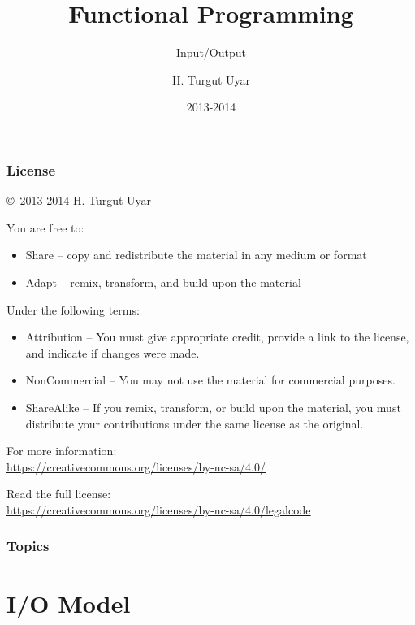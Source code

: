 \documentclass[dvipsnames]{beamer}
\title{Functional Programming}
\subtitle{Input/Output}
\author{H. Turgut Uyar}
\date{2013-2014}
\theoremstyle{plain}
\begin{document}
\begin{frame}
  \titlepage
\end{frame}

\begin{frame}
  \frametitle{License}

  \hfill
  \copyright~2013-2014 H. Turgut Uyar

  \vfill
  \begin{footnotesize}
    You are free to:
    \begin{itemize}
      \itemsep0em
      \item Share -- copy and redistribute the material in any medium or format
      \item Adapt -- remix, transform, and build upon the material
    \end{itemize}

    Under the following terms:
    \begin{itemize}
      \itemsep0em
      \item Attribution -- You must give appropriate credit, provide a link to
        the license, and indicate if changes were made.

      \item NonCommercial -- You may not use the material for commercial
        purposes.

      \item ShareAlike -- If you remix, transform, or build upon the material,
        you must distribute your contributions under the same license as the
        original.
    \end{itemize}
  \end{footnotesize}

  \begin{small}
    For more information:\\
    \url{https://creativecommons.org/licenses/by-nc-sa/4.0/}

    \smallskip
    Read the full license:\\
    \url{https://creativecommons.org/licenses/by-nc-sa/4.0/legalcode}
  \end{small}
\end{frame}

\begin{frame}
  \frametitle{Topics}
  \tableofcontents
\end{frame}

\section{I/O Model}
\end{document}
